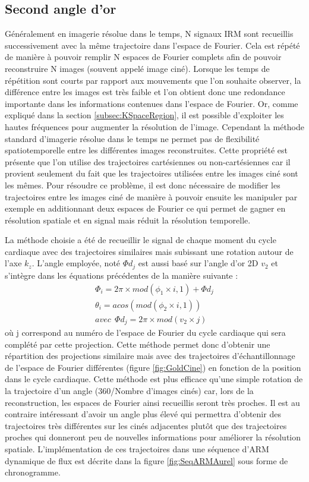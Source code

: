 \subsection{Second angle d'or}

Généralement en imagerie résolue dans le temps, N signaux IRM sont recueillis successivement avec la même trajectoire dans l'espace de Fourier. Cela est répété de manière à pouvoir remplir N espaces de Fourier complets afin de pouvoir reconstruire N images (souvent appelé image ciné). Lorsque les temps de répétition sont courts par rapport aux mouvements que l'on souhaite observer, la différence entre les images est très faible et l'on obtient donc une redondance importante dans les informations contenues dans l'espace de Fourier. Or, comme expliqué dans la section \ref{subsec:KSpaceRegion}, il est possible d'exploiter les hautes fréquences pour augmenter la résolution de l'image. Cependant la méthode standard d'imagerie résolue dans le temps ne permet pas de flexibilité spatiotemporelle entre les différentes images reconstruites. Cette propriété est présente que l'on utilise des trajectoires cartésiennes ou non-cartésiennes car il provient seulement du fait que les trajectoires utilisées entre les images ciné sont les mêmes. Pour résoudre ce problème, il est donc nécessaire de modifier les trajectoires entre les images ciné de manière à pouvoir ensuite les manipuler par exemple en additionnant deux espaces de Fourier ce qui permet de gagner en résolution spatiale et en signal mais réduit la résolution temporelle. 

La méthode choisie a été de recueillir le signal de chaque moment du cycle cardiaque avec des trajectoires similaires mais subissant une rotation autour de l'axe $k_z$. L'angle employée, noté $\Phi d_j$ est aussi basé sur l'angle d'or 2D $v_2$ et s'intègre dans les équations précédentes de la manière suivante :
\begin{equation}
\begin{array}{c}
\Phi_i=2\pi \times mod(\phi_1 \times i,1) +\Phi d_j\\
\theta_i=acos(mod(\phi_2 \times i,1)) \\
avec\ \ \Phi d_j=2\pi \times  mod( v_2 \times j)
\end{array}
\end{equation}
où j correspond au numéro de l'espace de Fourier du cycle cardiaque qui sera complété par cette projection. Cette méthode permet donc d'obtenir une répartition des projections similaire mais avec des trajectoires d'échantillonnage de l'espace de Fourier différentes (figure \ref{fig:GoldCine}) en fonction de la position dans le cycle cardiaque. Cette méthode est plus efficace qu'une simple rotation de la trajectoire d'un angle (360/Nombre d'images cinés) car, lors de la reconstruction, les espaces de Fourier ainsi recueillis seront très proches. Il est au contraire intéressant d'avoir un angle plus élevé qui permettra d'obtenir des trajectoires très différentes sur les cinés adjacentes plutôt que des trajectoires proches qui donneront peu de nouvelles informations pour améliorer la résolution spatiale. 
L'implémentation de ces trajectoires dans une séquence d'ARM dynamique de flux est décrite dans la figure \ref{fig:SeqARMAurel} sous forme de chronogramme.
 
